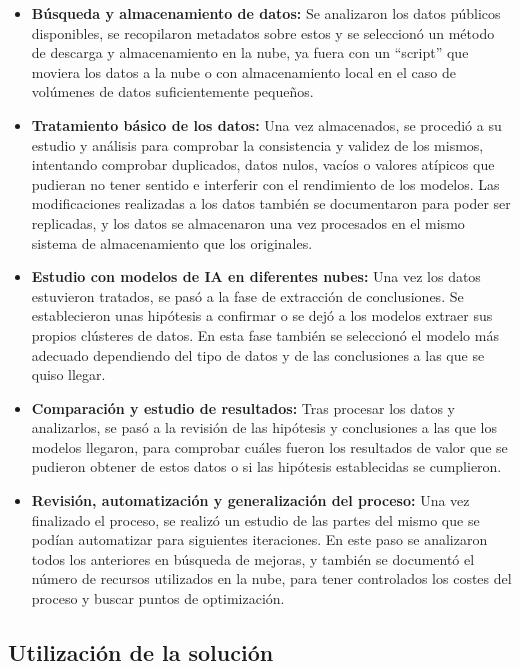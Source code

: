 \begin{itemize}
	\item \textbf{Búsqueda y almacenamiento de datos:} Se analizaron los datos públicos disponibles, se recopilaron metadatos sobre estos y se seleccionó un método de descarga y almacenamiento en la nube, ya fuera con un ``script'' que moviera los datos a la nube o con almacenamiento local en el caso de volúmenes de datos suficientemente pequeños. \\
	\item \textbf{Tratamiento básico de los datos:} Una vez almacenados, se procedió a su estudio y análisis para comprobar la consistencia y validez de los mismos, intentando comprobar duplicados, datos nulos, vacíos o valores atípicos que pudieran no tener sentido e interferir con el rendimiento de los modelos. Las modificaciones realizadas a los datos también se documentaron para poder ser replicadas, y los datos se almacenaron una vez procesados en el mismo sistema de almacenamiento que los originales. \\
	\item \textbf{Estudio con modelos de IA en diferentes nubes:} Una vez los datos estuvieron tratados, se pasó a la fase de extracción de conclusiones. Se establecieron unas hipótesis a confirmar o se dejó a los modelos extraer sus propios clústeres de datos. En esta fase también se seleccionó el modelo más adecuado dependiendo del tipo de datos y de las conclusiones a las que se quiso llegar. \\
	\item \textbf{Comparación y estudio de resultados:} Tras procesar los datos y analizarlos, se pasó a la revisión de las hipótesis y conclusiones a las que los modelos llegaron, para comprobar cuáles fueron los resultados de valor que se pudieron obtener de estos datos o si las hipótesis establecidas se cumplieron. \\
	\item \textbf{Revisión, automatización y generalización del proceso:} Una vez finalizado el proceso, se realizó un estudio de las partes del mismo que se podían automatizar para siguientes iteraciones. En este paso se analizaron todos los anteriores en búsqueda de mejoras, y también se documentó el número de recursos utilizados en la nube, para tener controlados los costes del proceso y buscar puntos de optimización. \\
\end{itemize}

\subsection{Utilización de la solución}

